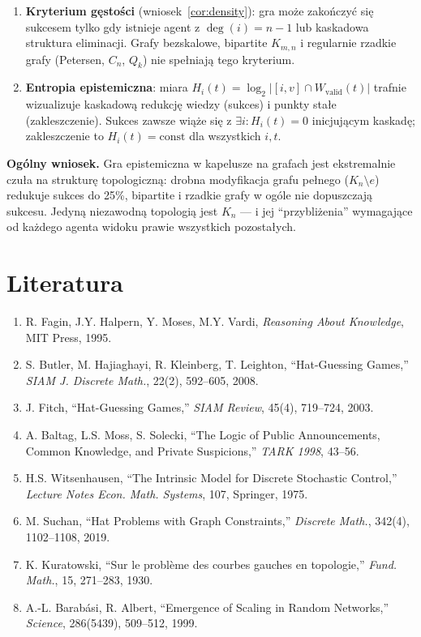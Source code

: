 \documentclass[12pt,a4paper]{article}
\theoremstyle{plain}
\theoremstyle{definition}
\theoremstyle{remark}
\newcommand{\Wval}{W_{\mathrm{valid}}}
\begin{document}
\begin{enumerate}
  \item \textbf{Kryterium gęstości} (wniosek~\ref{cor:density}): gra może zakończyć się sukcesem tylko gdy istnieje agent z $\deg(i) = n-1$ lub kaskadowa struktura eliminacji. Grafy bezskalowe, bipartite $K_{m,n}$ i regularnie rzadkie grafy (Petersen, $C_n$, $Q_k$) nie spełniają tego kryterium.
  \item \textbf{Entropia epistemiczna}: miara $H_i(t) = \log_2|[i,v] \cap \Wval(t)|$ trafnie wizualizuje kaskadową redukcję wiedzy (sukces) i punkty stałe (zakleszczenie). Sukces zawsze wiąże się z $\exists i : H_i(t) = 0$ inicjującym kaskadę; zakleszczenie to $H_i(t) = \mathrm{const}$ dla wszystkich $i, t$.
\end{enumerate}

\textbf{Ogólny wniosek.} Gra epistemiczna w kapelusze na grafach jest ekstremalnie czuła na strukturę topologiczną: drobna modyfikacja grafu pełnego ($K_n \setminus e$) redukuje sukces do 25\%, bipartite i rzadkie grafy w ogóle nie dopuszczają sukcesu. Jedyną niezawodną topologią jest $K_n$ — i jej ``przybliżenia'' wymagające od każdego agenta widoku prawie wszystkich pozostałych.

\section*{Literatura}

\begin{enumerate}
  \item R. Fagin, J.Y. Halpern, Y. Moses, M.Y. Vardi, \textit{Reasoning About Knowledge}, MIT Press, 1995.
  \item S. Butler, M. Hajiaghayi, R. Kleinberg, T. Leighton, ``Hat-Guessing Games,'' \textit{SIAM J. Discrete Math.}, 22(2), 592--605, 2008.
  \item J. Fitch, ``Hat-Guessing Games,'' \textit{SIAM Review}, 45(4), 719--724, 2003.
  \item A. Baltag, L.S. Moss, S. Solecki, ``The Logic of Public Announcements, Common Knowledge, and Private Suspicions,'' \textit{TARK 1998}, 43--56.
  \item H.S. Witsenhausen, ``The Intrinsic Model for Discrete Stochastic Control,'' \textit{Lecture Notes Econ. Math. Systems}, 107, Springer, 1975.
  \item M. Suchan, ``Hat Problems with Graph Constraints,'' \textit{Discrete Math.}, 342(4), 1102--1108, 2019.
  \item K. Kuratowski, ``Sur le problème des courbes gauches en topologie,'' \textit{Fund. Math.}, 15, 271--283, 1930.
  \item A.-L. Barabási, R. Albert, ``Emergence of Scaling in Random Networks,'' \textit{Science}, 286(5439), 509--512, 1999.
\end{enumerate}
\end{document}
